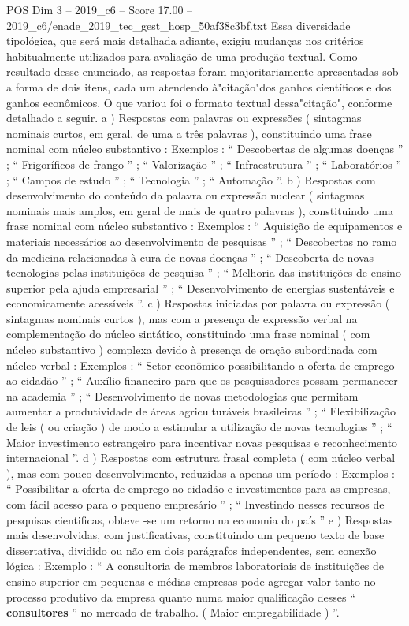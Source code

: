 \begin{textsample}{POS Dim 3 – 2019\_c6 – Score 17.00 – 2019\_c6/enade\_2019\_tec\_gest\_hosp\_50af38c3bf.txt}
Essa diversidade tipológica, que será mais detalhada adiante, exigiu mudanças nos critérios habitualmente utilizados para avaliação de uma produção textual.
Como resultado desse enunciado, as respostas foram majoritariamente apresentadas sob a forma de dois itens, cada um atendendo à"citação"dos ganhos científicos e dos ganhos econômicos.
O que variou foi o formato textual dessa"citação", conforme detalhado a seguir. a ) Respostas com palavras ou expressões ( sintagmas nominais curtos, em geral, de uma a três palavras ), constituindo uma frase nominal com núcleo substantivo : Exemplos : “ Descobertas de algumas doenças ” ; “ Frigoríficos de frango ” ; “ Valorização ” ; “ Infraestrutura ” ; “ Laboratórios ” ; “ Campos de estudo ” ; “ Tecnologia ” ; “ Automação ”. b ) Respostas com desenvolvimento do conteúdo da palavra ou expressão nuclear ( sintagmas nominais mais amplos, em geral de mais de quatro palavras ), constituindo uma frase nominal com núcleo substantivo : Exemplos : “ Aquisição de equipamentos e materiais necessários ao desenvolvimento de pesquisas ” ; “ Descobertas no ramo da medicina relacionadas à cura de novas doenças ” ; “ Descoberta de novas tecnologias pelas instituições de pesquisa ” ; “ Melhoria das instituições de ensino superior pela ajuda empresarial ” ; “ Desenvolvimento de energias sustentáveis e economicamente acessíveis ”. c ) Respostas iniciadas por palavra ou expressão ( sintagmas nominais curtos ), mas com a presença de expressão verbal na complementação do núcleo sintático, constituindo uma frase nominal ( com núcleo substantivo ) complexa devido à presença de oração subordinada com núcleo verbal : Exemplos : “ Setor econômico possibilitando a oferta de emprego ao cidadão ” ; “ Auxílio financeiro para que os pesquisadores possam permanecer na academia ” ; “ Desenvolvimento de novas metodologias que permitam aumentar a produtividade de áreas agriculturáveis brasileiras ” ; “ Flexibilização de leis ( ou criação ) de modo a estimular a utilização de novas tecnologias ” ; “ Maior investimento estrangeiro para incentivar novas pesquisas e reconhecimento internacional ”. d ) Respostas com estrutura frasal completa ( com núcleo verbal ), mas com pouco desenvolvimento, reduzidas a apenas um período : Exemplos : “ Possibilitar a oferta de emprego ao cidadão e investimentos para as empresas, com fácil acesso para o pequeno empresário ” ; “ Investindo nesses recursos de pesquisas cientificas, obteve -se um retorno na economia do país ” e ) Respostas mais desenvolvidas, com justificativas, constituindo um pequeno texto de base dissertativa, dividido ou não em dois parágrafos independentes, sem conexão lógica : Exemplo : “ A consultoria de membros laboratoriais de instituições de ensino superior em pequenas e médias empresas pode agregar valor tanto no processo produtivo da empresa quanto numa maior qualificação desses “ \textbf{consultores} ” no mercado de trabalho. ( Maior empregabilidade ) ”.

\end{textsample}
